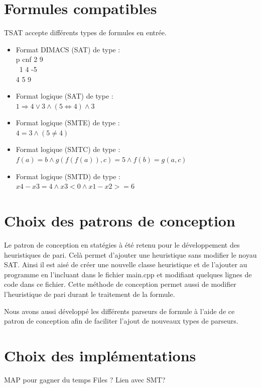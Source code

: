 \documentclass{article}
\begin{document}
\section{Formules compatibles}
TSAT accepte différents types de formules en entrée.
\begin{itemize}
    \item Format DIMACS (SAT) de type : \\
    p cnf 2 9\\\
    1 4 -5\\
    4 5 9
    \newline
    \item Format logique (SAT) de type : \\
    $
    1 \Rightarrow 4 \lor 3 \land (5 \Leftrightarrow 4) \land 3
    $
    \newline
    \item Format logique (SMTE) de type : \\
    $
    4 = 3 \land (5 \neq 4)
    $
    \newline
    \item Format logique (SMTC) de type : \\
    $
    f(a) = b \land g(f(f(a)), c) = 5 \land f(b) = g(a, c)
    $
    \newline
    \item Format logique (SMTD) de type : \\
    $
    x4 - x3 = 4 \land x3 < 0 \land x1 - x2 >= 6
    $
\end{itemize}

\section{Choix des patrons de conception}
Le patron de conception en statégies à été retenu pour le développement des heuristiques de pari. Celà permet d'ajouter une heuristique sans modifier le noyau SAT. Ainsi il est aisé de créer une nouvelle classe heuristique et de l'ajouter au programme en l'incluant dans le fichier main.cpp et modifiant quelques lignes de code dans ce fichier.
Cette méthode de conception permet aussi de modifier l'heuristique de pari durant le traitement de la formule.

Nous avons aussi développé les différents parseurs de formule à l'aide de ce patron de conception afin de faciliter l'ajout de nouveaux types de parseurs.
\section{Choix des implémentations}
MAP pour gagner du temps
Files ?
Lien avec SMT?
\end{document}
